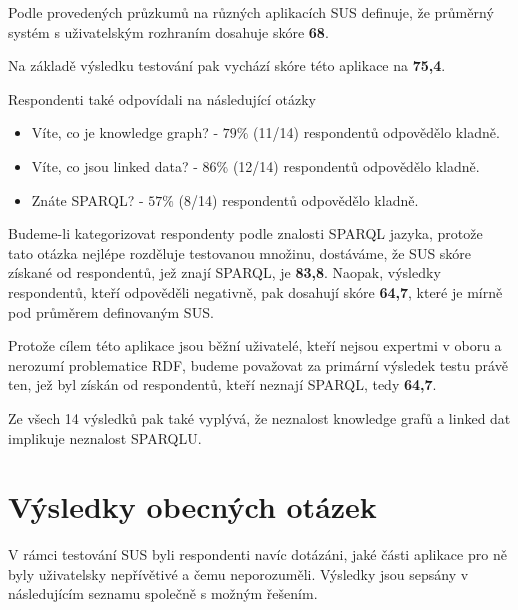 \noindent Podle provedených průzkumů na různých aplikacích SUS definuje, že průměrný systém s uživatelským rozhraním dosahuje skóre \textbf{68}.

\bigskip

\noindent Na základě výsledku testování pak vychází skóre této aplikace na \textbf{75,4}.

\newpage

\noindent Respondenti také odpovídali na následující otázky
\begin{itemize}
    \item Víte, co je knowledge graph? - $79\%$ (11/14) respondentů odpovědělo kladně.
    \item Víte, co jsou linked data? - $86\%$ (12/14) respondentů odpovědělo kladně.
    \item Znáte SPARQL? - $57\%$ (8/14) respondentů odpovědělo kladně.
\end{itemize}

Budeme-li kategorizovat respondenty podle znalosti SPARQL jazyka, protože tato otázka nejlépe rozděluje testovanou množinu, dostáváme, že SUS skóre získané od respondentů, jež znají SPARQL, je \textbf{83,8}. Naopak, výsledky respondentů, kteří odpověděli negativně, pak dosahují skóre \textbf{64,7}, které je mírně pod průměrem definovaným SUS.

\bigskip

Protože cílem této aplikace jsou běžní uživatelé, kteří nejsou expertmi v oboru a nerozumí problematice RDF, budeme považovat za primární výsledek testu právě ten, jež byl získán od respondentů, kteří neznají SPARQL, tedy \textbf{64,7}.

Ze všech 14 výsledků pak také vyplývá, že neznalost knowledge grafů a linked dat implikuje neznalost SPARQLU.

\section{Výsledky obecných otázek}
V rámci testování SUS byli respondenti navíc dotázáni, jaké části aplikace pro ně byly uživatelsky nepřívětivé a čemu neporozuměli. Výsledky jsou sepsány v následujícím seznamu společně s možným řešením.

